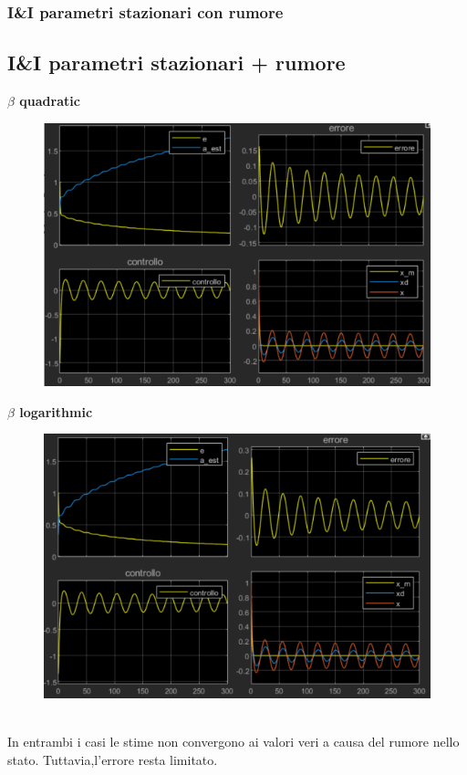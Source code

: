 \documentclass{beamer}
\begin{document}
\begin{frame}
	\frametitle{I\&I parametri stazionari con rumore}
	\subsection{I\&I parametri stazionari + rumore}
	\begin{minipage}[t]{0.45\textwidth}
		\textbf{\(\beta\) quadratic}
		\begin{figure}
			\includegraphics[scale=0.35]{2022-05-21-10-34-18.png} %
		\end{figure}
	\end{minipage}
	\begin{minipage}[t]{0.45\textwidth}
		\textbf{\(\beta\) logarithmic}
		\begin{figure}
			\includegraphics[scale=0.35]{2022-05-21-10-30-59.png} %
		\end{figure}
	\end{minipage}
	\vspace{0.1cm}\\
	In entrambi i casi le stime non convergono ai valori veri a causa del rumore nello stato. Tuttavia,l'errore resta limitato.
\end{frame}
\end{document}
